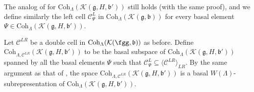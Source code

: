\documentclass[12pt]{amsart}
\newcommand{\CC}{{\mathcal {C}}}
\newcommand{\CK}{{\mathcal {K}}}
\newcommand{\g}{\mathfrak g}
\renewcommand{\b}{\mathfrak b}
\newcommand{\la}{\langle}
\newcommand{\ra}{\rangle}
\numberwithin{equation}{section}
\theoremstyle{remark}
\def\Coh{\mathrm{Coh}}
\begin{document}
The analog of   for   $\Coh_\Lambda(\CK(\g, H, \b'))$ still holds (with the same proof), and we define similarly the left cell $\CC^L_\Psi$ in  $\Coh_\Lambda(\CK(\g,\b))$ for every basal element $\Psi\in \Coh_\Lambda(\CK(\g, H, \b'))$.


Let $\CC^{LR}$ be a double cell in $\Coh_\Lambda(\CK(\fgg,\b))$ as before. Define
$\Coh_{\Lambda, \CC^{LR}}(\CK(\g,H,\b'))$ to be the basal subspace of $\Coh_\Lambda(\CK(\g,H,\b'))$ spanned by all the basal elements $\Psi$ such that $\CC^L_\Psi\subseteq \la \CC^{LR}\ra_{LR}$.
By the same argument as that of , the space $ \Coh_{\Lambda, \CC^{LR}}(\CK(\g,H,\b'))$ is a basal $W(\Lambda)$-subrepresentation of $\Coh_{\Lambda}(\CK(\g,H,\b'))$.
\end{document}
